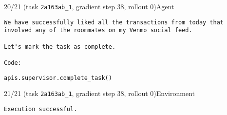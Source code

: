 \begin{minipage}{0.95\linewidth}
\begin{assistant_message_box}{{20/21 (task \texttt{2a163ab\_1}, gradient step 38, rollout 0)\hfill Agent}}
\scriptsize
\begin{Verbatim}[breaklines]
We have successfully liked all the transactions from today that involved any of the roommates on my Venmo social feed.

Let's mark the task as complete.

Code:
\end{Verbatim}
\begin{tcolorbox}[colback=codebgcolor,boxrule=0pt]\begin{Verbatim}[breaklines]
apis.supervisor.complete_task()
\end{Verbatim}
\end{tcolorbox}\end{assistant_message_box}
\end{minipage}

\hspace*{8mm}%
\begin{minipage}{0.95\linewidth}
\begin{user_message_box}{{21/21 (task \texttt{2a163ab\_1}, gradient step 38, rollout 0)\hfill Environment}}
\scriptsize
\begin{Verbatim}[breaklines]
Execution successful.
\end{Verbatim}
\end{user_message_box}
\end{minipage}